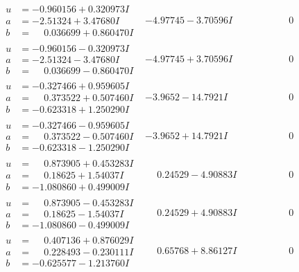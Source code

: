 \documentclass[1p]{elsarticle_modified}
\theoremstyle{definition}
\begin{document}
$$\begin{array}{c|c|c}
\begin{aligned}
u &= -0.960156 + 0.320973 I \\
a &= -2.51324 + 3.47680 I \\
b &= \phantom{-}0.036699 + 0.860470 I\end{aligned}
 & -4.97745 - 3.70596 I & \phantom{-0.000000 } 0 \\ \hline\begin{aligned}
u &= -0.960156 - 0.320973 I \\
a &= -2.51324 - 3.47680 I \\
b &= \phantom{-}0.036699 - 0.860470 I\end{aligned}
 & -4.97745 + 3.70596 I & \phantom{-0.000000 } 0 \\ \hline\begin{aligned}
u &= -0.327466 + 0.959605 I \\
a &= \phantom{-}0.373522 + 0.507460 I \\
b &= -0.623318 + 1.250290 I\end{aligned}
 & -3.9652 - 14.7921 I & \phantom{-0.000000 } 0 \\ \hline\begin{aligned}
u &= -0.327466 - 0.959605 I \\
a &= \phantom{-}0.373522 - 0.507460 I \\
b &= -0.623318 - 1.250290 I\end{aligned}
 & -3.9652 + 14.7921 I & \phantom{-0.000000 } 0 \\ \hline\begin{aligned}
u &= \phantom{-}0.873905 + 0.453283 I \\
a &= \phantom{-}0.18625 + 1.54037 I \\
b &= -1.080860 + 0.499009 I\end{aligned}
 & \phantom{-}0.24529 - 4.90883 I & \phantom{-0.000000 } 0 \\ \hline\begin{aligned}
u &= \phantom{-}0.873905 - 0.453283 I \\
a &= \phantom{-}0.18625 - 1.54037 I \\
b &= -1.080860 - 0.499009 I\end{aligned}
 & \phantom{-}0.24529 + 4.90883 I & \phantom{-0.000000 } 0 \\ \hline\begin{aligned}
u &= \phantom{-}0.407136 + 0.876029 I \\
a &= \phantom{-}0.228493 - 0.230111 I \\
b &= -0.625577 - 1.213760 I\end{aligned}
 & \phantom{-}0.65768 + 8.86127 I & \phantom{-0.000000 } 0 \\ \hline\begin{aligned}

\end{aligned}
\end{array}$$
\end{document}
